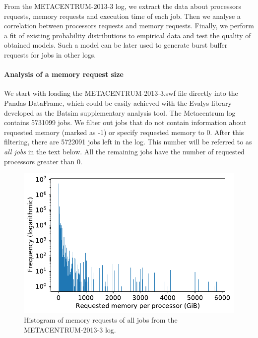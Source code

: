 \documentclass[thesis-en.tex]{subfiles}
\begin{document}
From the METACENTRUM-2013-3 log, we extract the data about processors requests, memory requests and execution time of each job. Then we analyse a correlation between processors requests and memory requests. Finally, we perform a fit of existing probability distributions to empirical data and test the quality of obtained models. Such a model can be later used to generate burst buffer requests for jobs in other logs. 

\paragraph{Analysis of a memory request size}
We start with loading the METACENTRUM-2013-3.swf file directly into the Pandas \cite{reback2020pandas, mckinney-proc-scipy-2010} DataFrame, which could be easily achieved with the Evalys library \cite{evalys} developed as the Batsim supplementary analysis tool. The Metacentrum log contains 5731099 jobs. We filter out jobs that do not contain information about requested memory (marked as -1) or specify requested memory to 0. After this filtering, there are 5722091 jobs left in the log. This number will be referred to as \emph{all jobs} in the text below. All the remaining jobs have the number of requested processors greater than 0.

\begin{figure}[htb]
    \includegraphics[width=\textwidth]{images/memory_requests_histogram.pdf}
    \caption{Histogram of memory requests of all jobs from the METACENTRUM-2013-3 log.}
    \label{fig:mem-req-hist}
\end{figure}
\end{document}

